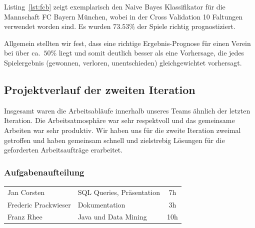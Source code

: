 \documentclass[
10pt,
a4paper
]{scrartcl}
\begin{document}
Listing~\ref{lst:fcb} zeigt exemplarisch den Naive Bayes Klassifikator für die Mannschaft FC Bayern München, wobei in der Cross Validation 10 Faltungen verwendet worden sind. 
Es wurden $73.53\%$ der Spiele richtig prognostiziert.



Allgemein stellten wir fest, dass eine richtige Ergebnis-Prognose für einen Verein bei über ca.~$50\%$ liegt und somit deutlich besser als eine Vorhersage, die jedes Spielergebnis (gewonnen, verloren, unentschieden) gleichgewichtet vorhersagt.


\subsection{Projektverlauf der zweiten Iteration}

Insgesamt waren die Arbeitsabläufe innerhalb unseres Teams ähnlich der letzten Iteration. Die Arbeitsatmosphäre war sehr respektvoll und das gemeinsame Arbeiten war sehr produktiv. Wir haben uns für die zweite Iteration zweimal getroffen und haben gemeinsam schnell und zielstrebig Lösungen für die geforderten Arbeitsaufträge erarbeitet.
 

\subsubsection{Aufgabenaufteilung}
\begin{tabular}{ l l c }
Jan Corsten & SQL Queries, Präsentation & 7h \\
Frederic Prackwieser & Dokumentation & 3h \\
Franz Rhee & Java und Data Mining & 10h \\
\end{tabular}
\end{document}
